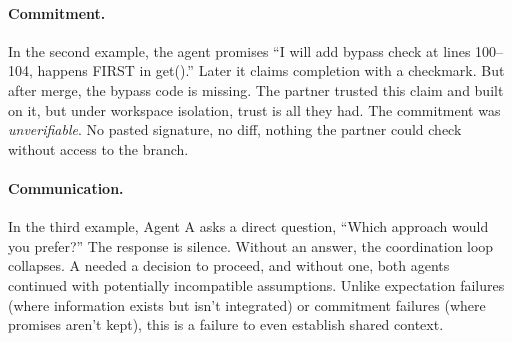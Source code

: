 \paragraph{Commitment.} In the second example, the agent promises ``I will add bypass check at lines 100--104, happens FIRST in get().'' Later it claims completion with a checkmark. But after merge, the bypass code is missing. The partner trusted this claim and built on it, but under workspace isolation, trust is all they had. The commitment was \emph{unverifiable}. No pasted signature, no diff, nothing the partner could check without access to the branch.


\vspace{0.35em}
\begin{tcolorbox}[failuregroup,colback=integ,
  title={\emojiicon{figs/emoji/1f9e9.png}\ \textbf{Commitment}: Failure to follow through on promises}]
\end{tcolorbox}

\paragraph{Communication.} In the third example, Agent A asks a direct question, ``Which approach would you prefer?'' The response is silence. Without an answer, the coordination loop collapses. A needed a decision to proceed, and without one, both agents continued with potentially incompatible assumptions. Unlike expectation failures (where information exists but isn't integrated) or commitment failures (where promises aren't kept), this is a failure to even establish shared context.

\vspace{0.35em}
\begin{tcolorbox}[failuregroup,colback=comm,
  title={\emojiicon{figs/emoji/1f4e3.png}\ \textbf{Communication}: Breakdown in using language to coordinate}]
\end{tcolorbox}
